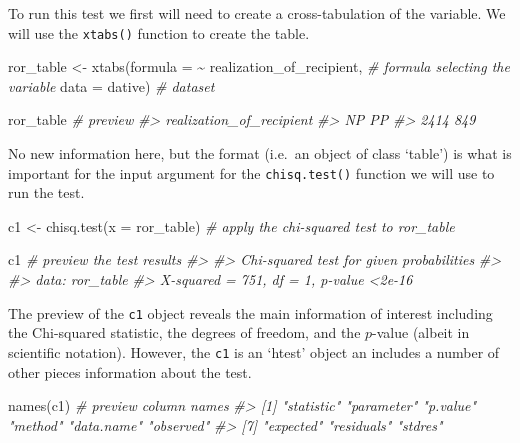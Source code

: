 \documentclass[
]{article}
\newenvironment{Shaded}{\begin{snugshade}}{\end{snugshade}}
\newcommand{\AttributeTok}[1]{\textcolor[rgb]{0.77,0.63,0.00}{#1}}
\newcommand{\CommentTok}[1]{\textcolor[rgb]{0.56,0.35,0.01}{\textit{#1}}}
\newcommand{\FunctionTok}[1]{\textcolor[rgb]{0.00,0.00,0.00}{#1}}
\newcommand{\NormalTok}[1]{#1}
\newcommand{\OtherTok}[1]{\textcolor[rgb]{0.56,0.35,0.01}{#1}}
\newcommand{\SpecialCharTok}[1]{\textcolor[rgb]{0.00,0.00,0.00}{#1}}
\begin{document}
To run this test we first will need to create a cross-tabulation of the variable. We will use the \texttt{xtabs()} function to create the table.

\begin{Shaded}
\begin{Highlighting}[]
\NormalTok{ror\_table }\OtherTok{\textless{}{-}} 
  \FunctionTok{xtabs}\NormalTok{(}\AttributeTok{formula =} \SpecialCharTok{\textasciitilde{}}\NormalTok{ realization\_of\_recipient, }\CommentTok{\# formula selecting the variable}
        \AttributeTok{data =}\NormalTok{ dative) }\CommentTok{\# dataset}

\NormalTok{ror\_table }\CommentTok{\# preview}
\CommentTok{\#\textgreater{} realization\_of\_recipient}
\CommentTok{\#\textgreater{}   NP   PP }
\CommentTok{\#\textgreater{} 2414  849}
\end{Highlighting}
\end{Shaded}

No new information here, but the format (i.e.~an object of class `table') is what is important for the input argument for the \texttt{chisq.test()} function we will use to run the test.

\begin{Shaded}
\begin{Highlighting}[]
\NormalTok{c1 }\OtherTok{\textless{}{-}} \FunctionTok{chisq.test}\NormalTok{(}\AttributeTok{x =}\NormalTok{ ror\_table)  }\CommentTok{\# apply the chi{-}squared test to \textasciigrave{}ror\_table\textasciigrave{}}

\NormalTok{c1  }\CommentTok{\# preview the test results}
\CommentTok{\#\textgreater{} }
\CommentTok{\#\textgreater{}  Chi{-}squared test for given probabilities}
\CommentTok{\#\textgreater{} }
\CommentTok{\#\textgreater{} data:  ror\_table}
\CommentTok{\#\textgreater{} X{-}squared = 751, df = 1, p{-}value \textless{}2e{-}16}
\end{Highlighting}
\end{Shaded}

The preview of the \texttt{c1} object reveals the main information of interest including the Chi-squared statistic, the degrees of freedom, and the \(p\)-value (albeit in scientific notation). However, the \texttt{c1} is an `htest' object an includes a number of other pieces information about the test.

\begin{Shaded}
\begin{Highlighting}[]
\FunctionTok{names}\NormalTok{(c1)  }\CommentTok{\# preview column names}
\CommentTok{\#\textgreater{} [1] "statistic" "parameter" "p.value"   "method"    "data.name" "observed" }
\CommentTok{\#\textgreater{} [7] "expected"  "residuals" "stdres"}
\end{Highlighting}
\end{Shaded}
\end{document}
